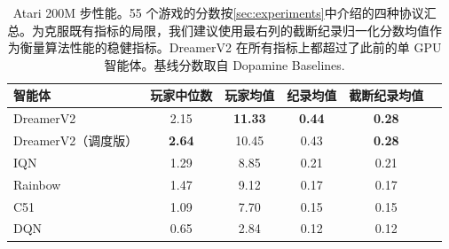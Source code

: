 \begin{table}[b]
\centering
\small
\begin{tabular}{lccccc}
\toprule
\textbf{智能体} & \textbf{玩家中位数} & \textbf{玩家均值} & \textbf{纪录均值} & \textbf{截断纪录均值} \\
\midrule
DreamerV2 & 2.15 & \textbf{11.33} & \textbf{0.44} & \textbf{0.28} \\
DreamerV2（调度版）& \textbf{2.64} & 10.45 & 0.43 & \textbf{0.28} \\
IQN& 1.29 & \hphantom{0}8.85 & 0.21 & 0.21 \\
Rainbow & 1.47 & \hphantom{0}9.12 & 0.17 & 0.17 \\
C51 & 1.09 & \hphantom{0}7.70 & 0.15 & 0.15 \\
DQN & 0.65 & \hphantom{0}2.84 & 0.12 & 0.12 \\
\bottomrule
\end{tabular}
\caption{Atari 200M 步性能。55 个游戏的分数按\cref{sec:experiments}中介绍的四种协议汇总。为克服既有指标的局限，我们建议使用最右列的截断纪录归一化分数均值作为衡量算法性能的稳健指标。DreamerV2 在所有指标上都超过了此前的单 GPU 智能体。基线分数取自 Dopamine Baselines\citep{castro2018dopamine}.}
\label{tab:agg}
\end{table}
